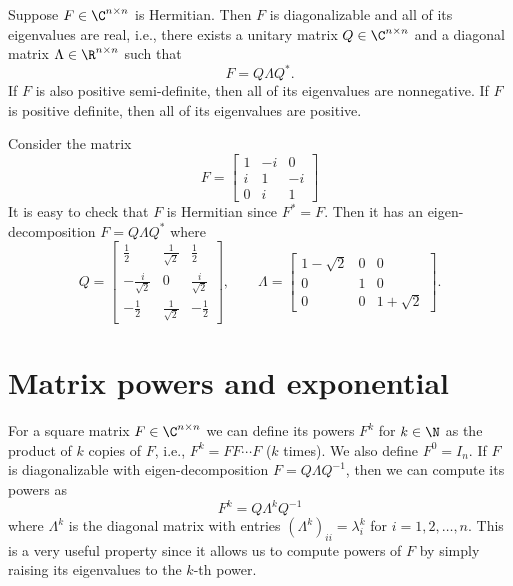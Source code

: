\begin{lemma}
    Suppose $F \in \C^{n \times n}$ is Hermitian. 
    Then $F$ is diagonalizable and all of its eigenvalues are real, i.e., 
    there exists a unitary matrix $Q \in \C^{n \times n}$ and a diagonal matrix $\Lambda \in \R^{n \times n}$ such that
    \begin{equation*}
        F = Q \Lambda Q^*.
    \end{equation*}
    If $F$ is also positive semi-definite, then all of its eigenvalues are nonnegative. If $F$ is positive definite, then all of its eigenvalues are positive.
\end{lemma}

\begin{example}
    Consider the matrix 
    \begin{equation*}
        F = \begin{bmatrix}
            1 & - i & 0 \\ 
            i & 1 & -i \\ 
            0 & i & 1
        \end{bmatrix}
    \end{equation*}
    It is easy to check that $F$ is Hermitian since $F^* = F$. Then it has an eigen-decomposition $F = Q \Lambda Q^*$ where
    \begin{equation*}
        Q =  \begin{bmatrix}
            \frac12 & \frac{1}{\sqrt{2}} & \frac12 \\
            -\frac{i}{\sqrt{2}} & 0 & \frac{i}{\sqrt{2}} \\
            - \frac12 & \frac{1}{\sqrt{2}} & -\frac12
        \end{bmatrix}, \qquad
        \Lambda = \begin{bmatrix}
            1 - \sqrt{2} & 0 & 0 \\
            0 & 1 & 0 \\
            0 & 0 & 1 + \sqrt{2}
        \end{bmatrix}.
    \end{equation*}
\end{example}


\section{Matrix powers and exponential}
For a square matrix $F \in \C^{n \times n}$ we can define its powers $F^k$ for $k \in \N$ as the product of $k$ copies of $F$, i.e., $F^k = F F \cdots F$ ($k$ times). We also define $F^0 = I_n$. If $F$ is diagonalizable with eigen-decomposition $F = Q \Lambda Q^{-1}$, then we can compute its powers as
\begin{equation*}
    F^k = Q \Lambda^k Q^{-1}
\end{equation*}
where $\Lambda^k$ is the diagonal matrix with entries $(\Lambda^k)_{ii} = \lambda_i^k$ for $i=1,2,\ldots,n$. This is a very useful property since it allows us to compute powers of $F$ by simply raising its eigenvalues to the $k$-th power.


